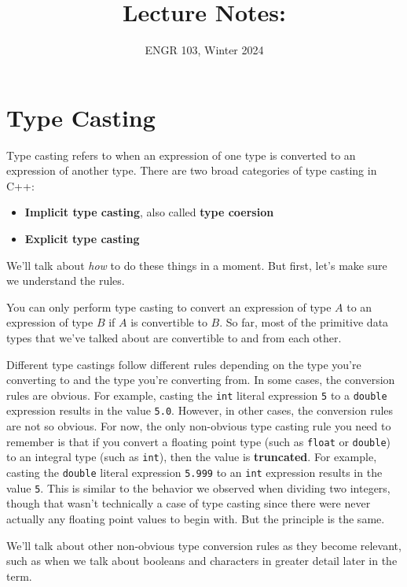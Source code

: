 \documentclass{article}
\title{
    Lecture Notes: \lecturetitle
}
\author{ENGR 103, Winter 2024}
\date{}
\begin{document}
\maketitle

\section{Type Casting}

Type casting refers to when an expression of one type is converted to an expression of another type. There are two broad categories of type casting in C++:

\begin{itemize}
    \item \textbf{Implicit type casting}, also called \textbf{type coersion}
    \item \textbf{Explicit type casting}
\end{itemize}

We'll talk about \textit{how} to do these things in a moment. But first, let's make sure we understand the rules.

You can only perform type casting to convert an expression of type $A$ to an expression of type $B$ if $A$ is convertible to $B$. So far, most of the primitive data types that we've talked about are convertible to and from each other.

Different type castings follow different rules depending on the type you're converting to and the type you're converting from. In some cases, the conversion rules are obvious. For example, casting the \texttt{int} literal expression \texttt{5} to a \texttt{double} expression results in the value \texttt{5.0}. However, in other cases, the conversion rules are not so obvious. For now, the only non-obvious type casting rule you need to remember is that if you convert a floating point type (such as \texttt{float} or \texttt{double}) to an integral type (such as \texttt{int}), then the value is \textbf{truncated}. For example, casting the \texttt{double} literal expression \texttt{5.999} to an \texttt{int} expression results in the value \texttt{5}. This is similar to the behavior we observed when dividing two integers, though that wasn't technically a case of type casting since there were never actually any floating point values to begin with. But the principle is the same.

We'll talk about other non-obvious type conversion rules as they become relevant, such as when we talk about booleans and characters in greater detail later in the term.
\end{document}
